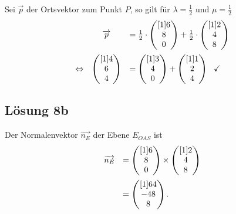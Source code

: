 Sei $\vec{p}$ der Ortsvektor zum Punkt $P$, so gilt für $\lambda =\frac{1}{2}$ und $\mu =\frac{1}{2}$ 
\begin{equation*}
	\begin{array}{ c c l }
		& \vec{p} & =\frac{1}{2} \cdotp \begin{pmatrix}[1]
			6\\
			8\\
			0
		\end{pmatrix} +\frac{1}{2} \cdotp \begin{pmatrix}[1]
			2\\
			4\\
			8
		\end{pmatrix}\vspace{2mm}\\
		\Leftrightarrow  & \begin{pmatrix}[1]
			4\\
			6\\
			4
		\end{pmatrix} & =\begin{pmatrix}[1]
			3\\
			4\\
			0
		\end{pmatrix} +\begin{pmatrix}[1]
			1\\
			2\\
			4
		\end{pmatrix} \ \ \checkmark
	\end{array}
\end{equation*}

\subsection{Lösung 8b}
Der Normalenvektor $\overrightarrow{n_{E}}$ der Ebene $E_{OAS}$ ist
\begin{equation*}
	\begin{array}{ c l }
		\overrightarrow{n_{E}} & =\begin{pmatrix}[1]
			6\\
			8\\
			0
		\end{pmatrix} \times \begin{pmatrix}[1]
			2\\
			4\\
			8
		\end{pmatrix}\vspace{2mm}\\
		& =\begin{pmatrix}[1]
			64\\
			-48\\
			8
		\end{pmatrix}\text{.}
	\end{array}
\end{equation*}

